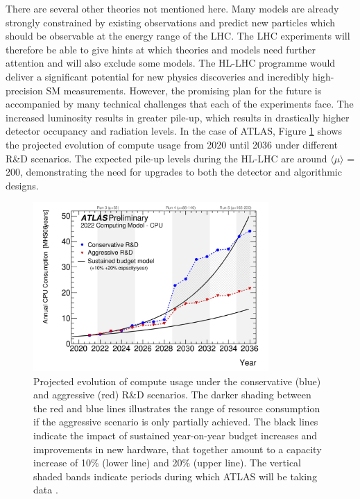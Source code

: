 


There are several other theories not mentioned here. Many models are already strongly constrained by existing observations and predict new particles which should be observable at the energy range of the LHC. The LHC experiments will therefore be able to give hints at which theories and models need further attention and will also exclude some models. The HL-LHC programme would deliver a significant potential for new physics discoveries and incredibly high-precision SM measurements. However, the promising plan for the future is accompanied by many technical challenges that each of the experiments face. The increased luminosity results in greater pile-up, which results in drastically higher detector occupancy and radiation levels. In the case of ATLAS, Figure \ref{fig:pileup-walltime} shows the projected evolution of compute usage from 2020 until 2036 under different R\&D scenarios. The expected pile-up levels during the HL-LHC are around $\langle \mu \rangle$ = 200, demonstrating the need for upgrades to both the detector and algorithmic designs.

\begin{figure}[!htbp]
  \centering
  \includegraphics[width=0.8\textwidth]{images/2-LHC-ATLAS/computing-model.png}
  \caption{
    Projected evolution of compute usage under the conservative (blue) and aggressive (red) R\&D scenarios. The darker shading between the red and blue lines illustrates the range of resource consumption if the aggressive scenario is only partially achieved. The black lines indicate the impact of sustained year-on-year budget increases and improvements in new hardware, that together amount to a capacity increase of 10\% (lower line) and 20\% (upper line). The vertical shaded bands indicate periods during which ATLAS will be taking data \cite{Collaboration:2802918}.
  }
  \label{fig:pileup-walltime}
\end{figure}

